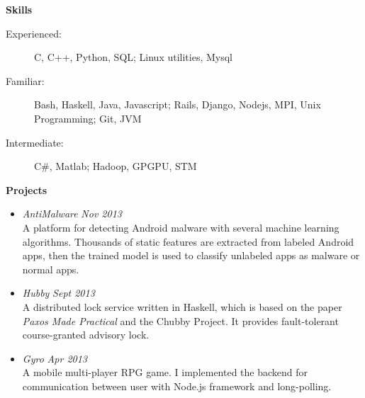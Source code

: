 \documentclass[letterpaper,11pt]{article}
\newcommand{\resheading}[1]{{\large \colorbox{mygrey}{\begin{minipage}{\textwidth}{\textbf{#1 \vphantom{p\^{E}}}}\end{minipage}}}}
\begin{document}
\resheading{Skills}
	\begin{description}
	\item[Experienced:] { \footnotesize C, C++, Python, SQL; Linux utilities, Mysql}
	\item[Familiar:] { \footnotesize Bash, Haskell, Java, Javascript; Rails, Django, Nodejs, MPI, Unix Programming; Git, JVM}
	\item[Intermediate:] { \footnotesize C\#, Matlab; Hadoop, GPGPU, STM}
	\end{description} %
\resheading{Projects}
	\begin{itemize}
	\item
	{\sl AntiMalware} \hfill \textit{Nov 2013}\\
	{ \footnotesize 
		{A platform for detecting Android malware with several machine learning algorithms. Thousands of static features are extracted from labeled Android apps, then the trained model is used to classify unlabeled apps as malware or normal apps.}
	}
\item 
	{\sl Hubby} \hfill \textit{Sept 2013}\\
	{\footnotesize
	{A distributed lock service written in Haskell, which is based on the paper \emph{Paxos Made Practical} and the Chubby Project. It provides fault-tolerant course-granted advisory lock.}
	}
\item
	{\sl Gyro} \hfill \textit{Apr 2013}\\ 
	{ \footnotesize A mobile multi-player RPG game. I implemented the backend for communication between user with Node.js framework and long-polling.}
\end{itemize}
\end{document}
